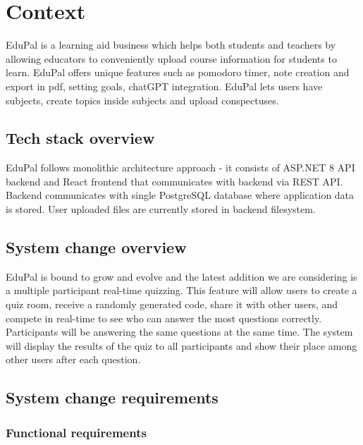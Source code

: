 \section{Context}

EduPal is a learning aid business which helps both students and teachers by allowing educators to conveniently upload course information for students to learn. EduPal offers unique features such as pomodoro timer, note creation and export in pdf, setting goals, chatGPT integration. EduPal lets users have subjects, create topics inside subjects and upload conspectuses.

\subsection{Tech stack overview}

EduPal follows monolithic architecture approach - it consists of ASP.NET 8 API backend and React frontend that communicates with backend via REST API. Backend communicates with single PostgreSQL database where application data is stored. User uploaded files are currently stored in backend filesystem.

\subsection{System change overview}

EduPal is bound to grow and evolve and the latest addition we are considering is a multiple participant real-time quizzing. This feature will allow users to create a quiz room, receive a randomly generated code, share it with other users, and compete in real-time to see who can answer the most questions correctly. Participants will be answering the same questions at the same time. The system will display the results of the quiz to all participants and show their place among other users after each question.

\subsection{System change requirements}

\subsubsection{Functional requirements}


